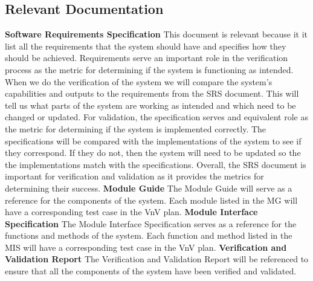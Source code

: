 \documentclass[12pt, titlepage]{article}
\begin{document}
\subsection{Relevant Documentation}


\noindent \textbf{Software Requirements Specification} \citet{SRS}
\newline
This document is relevant because it it list all the requirements that the system should have and specifies how they should be achieved.
Requirements serve an important role in the verification process as the metric for determining if the system is functioning as intended.
When we do the verification of the system we will compare the system's capabilities and outputs to the requirements from the SRS document.
This will tell us what parts of the system are working as intended and which need to be changed or updated.
For validation, the specification serves and equivalent role as the metric for determining if the system is implemented correctly.
The specifications will be compared with the implementations of the system to see if they correspond.
If they do not, then the system will need to be updated so the the implementations match with the specifications.
Overall, the SRS document is important for verification and validation as it provides the metrics for determining their success.
\bigskip
\newline
\textbf{Module Guide}
\newline
The Module Guide will serve as a reference for the components of the system.
Each module listed in the MG will have a corresponding test case in the VnV plan.
\bigskip
\newline
\textbf{Module Interface Specification}
\newline
The Module Interface Specification serves as a reference for the functions and methods of the system.
Each function and method listed in the MIS will have a corresponding test case in the VnV plan.
\bigskip
\newline
\textbf{Verification and Validation Report}
\newline
The Verification and Validation Report will be referenced to ensure that all the components of the system have been verified and validated.
\end{document}
